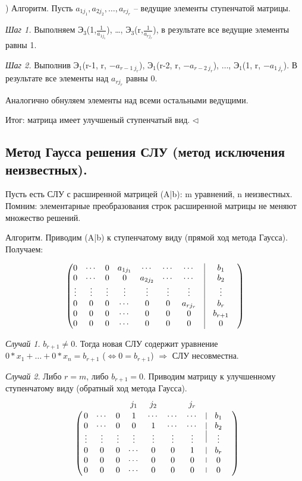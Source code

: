 ) Алгоритм. Пусть $a_{1j_1}, a_{2j_2}, \dots, a_{rj_r}$ -- ведущие элементы ступенчатой матрицы.

\textit{Шаг 1.} Выполняем $Э_3$(1,$\frac{1}{a_{1j_1}}$), \dots, $Э_3$(r,$\frac{1}{a_{rj_r}}$), в результате все ведущие элементы равны 1.

\textit{Шаг 2.} Выполнив $Э_1$(r-1, r, $-a_{{r-1}\ j_r}$), $Э_1$(r-2, r, $-a_{{r-2}\ j_r}$), $\dots$, $Э_1$(1, r, $-a_{1\ j_r}$). В результате все элементы над $a_{rj_r}$ равны 0.

Аналогично обнуляем элементы над всеми остальными ведущими. 

Итог: матрица имеет улучшеный ступенчатый вид. $\lhd$

\bigskip
\subsection{Метод Гаусса решения СЛУ (метод исключения неизвестных).}

Пусть есть СЛУ с расширенной матрицей (A|b): m уравнений, n неизвестных. Помним: элементарные преобразования строк расширенной матрицы не меняют множество решений.

Алгоритм. Приводим (A|b) к ступенчатому виду (прямой ход метода Гаусса). Получаем: 

\begin{equation*}
	\begin{pmatrix}
		0 & \cdots & 0 & a_{1j_1} & \cdots & \cdots & \cdots & \vrule & b_1 \\
		0 & \cdots & 0 & 0 & a_{2j_2} & \cdots & \cdots & \vrule & b_2 \\
       \vdots & \vdots & \vdots& \vdots & \vdots & \vdots & \vdots & \vrule & \vdots & \\ 
       0 & 0 & 0 & \cdots & 0 & 0 & a_{rj_r} & \vrule & b_r \\
       0 & 0 & 0 & \cdots & 0 & 0 & 0 & \vrule & b_{r+1} \\
       0 & 0 & 0 & \cdots & 0 & 0 & 0 & \vrule & 0
	\end{pmatrix}
\end{equation*}


\textit{Случай 1.} $b_{r+1} \neq 0$. Тогда новая СЛУ содержит уравнение $0*x_1 + \dots + 0*x_n = b_{r+1}$ ($\Leftrightarrow 0 = b_{r+1}$) $\Rightarrow$ СЛУ несовместна.

\textit{Случай 2.} Либо $r = m$, либо $b_{r+1} = 0$. Приводим матрицу к улучшенному ступенчатому виду (обратный ход метода Гаусса).
\begin{equation*}
	\bordermatrix{ 
    	 & & & & j_1 & j_2 & & j_r & \cr
    	 & 0 & \cdots & 0 & 1 & \cdots & \cdots & \cdots & \vrule & b_1 \cr
		 & 0 & \cdots & 0 & 0 & 1 & \cdots & \cdots & \vrule & b_2 \cr
        & \vdots & \vdots & \vdots& \vdots & \vdots & \vdots & \vdots & \vrule & \vdots & \cr 
        & 0 & 0 & 0 & \cdots & 0 & 0 & 1 & \vrule & b_r \cr
        & 0 & 0 & 0 & \cdots & 0 & 0 & 0 & \vrule & 0 \cr
        & 0 & 0 & 0 & \cdots & 0 & 0 & 0 & \vrule & 0}
\end{equation*}

